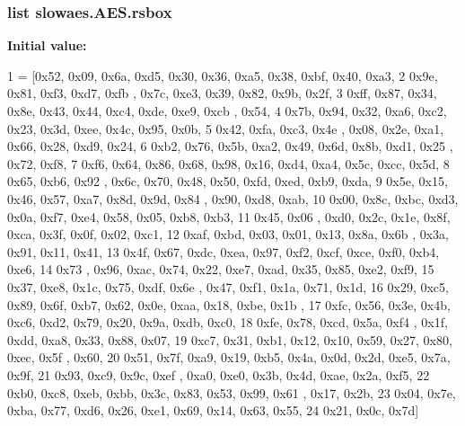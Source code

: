 \hypertarget{classslowaes_1_1_a_e_s_ab854386b91e23a5a6c2b6a0fff48800f}{
\subsubsection[{rsbox}]{\setlength{\rightskip}{0pt plus 5cm}list slowaes.\-A\-E\-S.\-rsbox\hspace{0.3cm}{\ttfamily [static]}}}\label{classslowaes_1_1_a_e_s_ab854386b91e23a5a6c2b6a0fff48800f}
{\bfseries Initial value\-:}
\begin{DoxyCode}
1 = [0x52, 0x09, 0x6a, 0xd5, 0x30, 0x36, 0xa5, 0x38, 0xbf, 0x40, 0xa3,
2             0x9e, 0x81, 0xf3, 0xd7, 0xfb , 0x7c, 0xe3, 0x39, 0x82, 0x9b, 0x2f,
3             0xff, 0x87, 0x34, 0x8e, 0x43, 0x44, 0xc4, 0xde, 0xe9, 0xcb , 0x54,
4             0x7b, 0x94, 0x32, 0xa6, 0xc2, 0x23, 0x3d, 0xee, 0x4c, 0x95, 0x0b,
5             0x42, 0xfa, 0xc3, 0x4e , 0x08, 0x2e, 0xa1, 0x66, 0x28, 0xd9, 0x24,
6             0xb2, 0x76, 0x5b, 0xa2, 0x49, 0x6d, 0x8b, 0xd1, 0x25 , 0x72, 0xf8,
7             0xf6, 0x64, 0x86, 0x68, 0x98, 0x16, 0xd4, 0xa4, 0x5c, 0xcc, 0x5d,
8             0x65, 0xb6, 0x92 , 0x6c, 0x70, 0x48, 0x50, 0xfd, 0xed, 0xb9, 0xda,
9             0x5e, 0x15, 0x46, 0x57, 0xa7, 0x8d, 0x9d, 0x84 , 0x90, 0xd8, 0xab,
10             0x00, 0x8c, 0xbc, 0xd3, 0x0a, 0xf7, 0xe4, 0x58, 0x05, 0xb8, 0xb3,
11             0x45, 0x06 , 0xd0, 0x2c, 0x1e, 0x8f, 0xca, 0x3f, 0x0f, 0x02, 0xc1,
12             0xaf, 0xbd, 0x03, 0x01, 0x13, 0x8a, 0x6b , 0x3a, 0x91, 0x11, 0x41,
13             0x4f, 0x67, 0xdc, 0xea, 0x97, 0xf2, 0xcf, 0xce, 0xf0, 0xb4, 0xe6,
14             0x73 , 0x96, 0xac, 0x74, 0x22, 0xe7, 0xad, 0x35, 0x85, 0xe2, 0xf9,
15             0x37, 0xe8, 0x1c, 0x75, 0xdf, 0x6e , 0x47, 0xf1, 0x1a, 0x71, 0x1d,
16             0x29, 0xc5, 0x89, 0x6f, 0xb7, 0x62, 0x0e, 0xaa, 0x18, 0xbe, 0x1b ,
17             0xfc, 0x56, 0x3e, 0x4b, 0xc6, 0xd2, 0x79, 0x20, 0x9a, 0xdb, 0xc0,
18             0xfe, 0x78, 0xcd, 0x5a, 0xf4 , 0x1f, 0xdd, 0xa8, 0x33, 0x88, 0x07,
19             0xc7, 0x31, 0xb1, 0x12, 0x10, 0x59, 0x27, 0x80, 0xec, 0x5f , 0x60,
20             0x51, 0x7f, 0xa9, 0x19, 0xb5, 0x4a, 0x0d, 0x2d, 0xe5, 0x7a, 0x9f,
21             0x93, 0xc9, 0x9c, 0xef , 0xa0, 0xe0, 0x3b, 0x4d, 0xae, 0x2a, 0xf5,
22             0xb0, 0xc8, 0xeb, 0xbb, 0x3c, 0x83, 0x53, 0x99, 0x61 , 0x17, 0x2b,
23             0x04, 0x7e, 0xba, 0x77, 0xd6, 0x26, 0xe1, 0x69, 0x14, 0x63, 0x55,
24             0x21, 0x0c, 0x7d]
\end{DoxyCode}
